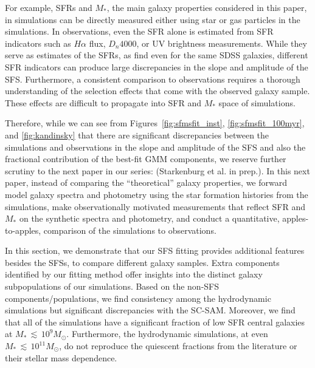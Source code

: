 \documentclass[preprint2,tighten]{aastex62}
\begin{document}
{For example, SFRs and $M_*$, the 
main galaxy properties considered in this paper, in simulations can be
directly measured either using star or gas particles in the simulations.  
In observations, even the SFR alone is estimated from SFR indicators 
such as $H\alpha$ flux, $D_n 4000$, or UV brightness measurements. 
While they serve as estimates of the SFRs, as \cite{speagle2014} find even 
for the same SDSS galaxies, different SFR indicators can produce large 
discrepancies in the slope and amplitude of the SFS. Furthermore, a 
consistent comparison to observations requires a thorough understanding of 
the selection effects that come with the observed galaxy sample. These 
effects are difficult to propagate into SFR and $M_*$ space of simulations. 


Therefore, while we can see from Figures~\ref{fig:sfmsfit_inst}, 
\ref{fig:sfmsfit_100myr}, and \ref{fig:kandinsky} that there are significant
discrepancies between the simulations and observations in the slope and 
amplitude of the SFS and also the fractional contribution of the best-fit 
GMM components, we reserve further scrutiny to the next paper in our 
series: (Starkenburg et al. in prep.). In this next paper, instead of
comparing the ``theoretical'' galaxy properties, we forward model galaxy 
spectra and photometry using the star formation histories from the
simulations, make observationally motivated measurements that reflect 
SFR and $M_*$ on the synthetic spectra and photometry, and conduct a 
quantitative, apples-to-apples, comparison of the simulations to observations.}

In this section, we demonstrate that our SFS fitting provides additional 
features besides the SFSs, to compare different galaxy samples. Extra 
components identified by our fitting method offer insights into the 
distinct galaxy subpopulations of our simulations. Based on the non-SFS 
components/populations, we find consistency among the hydrodynamic
simulations but significant discrepancies with the 
SC-SAM. Moreover, we find that all of the simulations have a significant
fraction of low SFR central galaxies at $M_*\,{\lesssim}\,10^9M_\odot$.
Furthermore, the hydrodynamic simulations, at even $M_*\,{\lesssim}\,10^{11}M_\odot$, 
do not reproduce the quiescent fractions 
from the literature or their stellar mass dependence. 
\end{document}
